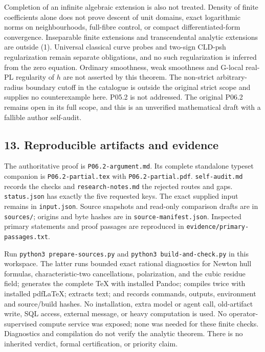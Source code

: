 \documentclass[11pt]{article}
\begin{document}
Completion of an infinite algebraic extension is also not treated.
Density of finite coefficients alone does not prove descent of unit
domains, exact logarithmic norms on neighbourhoods, full-fibre control,
or compact differentiated-form convergence. Inseparable finite
extensions and transcendental analytic extensions are outside (1).
Universal classical curve probes and two-sign CLD-psh regularization
remain separate obligations, and no such regularization is inferred from
the zero equation. Ordinary smoothness, weak smoothness and G-local
real-PL regularity of \(h\) are not asserted by this theorem. The
non-strict arbitrary-radius boundary cutoff in the catalogue is outside
the original strict scope and supplies no counterexample here. P05.2 is
not addressed. The original P06.2 remains open in its full scope, and
this is an unverified mathematical draft with a fallible author
self-audit.

\subsection{13. Reproducible artifacts and
evidence}\label{reproducible-artifacts-and-evidence}

The authoritative proof is \texttt{P06.2-argument.md}. Its complete
standalone typeset companion is \texttt{P06.2-partial.tex} with
\texttt{P06.2-partial.pdf}. \texttt{self-audit.md} records the checks
and \texttt{research-notes.md} the rejected routes and gaps.
\texttt{status.json} has exactly the five requested keys. The exact
supplied input remains in \texttt{input.json}. Source snapshots and
read-only comparison drafts are in \texttt{sources/}; origins and byte
hashes are in \texttt{source-manifest.json}. Inspected primary
statements and proof passages are reproduced in
\texttt{evidence/primary-passages.txt}.

Run \texttt{python3\ prepare-sources.py} and
\texttt{python3\ build-and-check.py} in this workspace. The latter runs
bounded exact rational diagnostics for Newton hull formulas,
characteristic-two cancellations, polarization, and the cubic residue
field; generates the complete TeX with installed Pandoc; compiles twice
with installed pdfLaTeX; extracts text; and records commands, outputs,
environment and source/build hashes. No installation, extra model or
agent call, old-artifact write, SQL access, external message, or heavy
computation is used. No operator-supervised compute service was exposed;
none was needed for these finite checks. Diagnostics and compilation do
not verify the analytic theorem. There is no inherited verdict, formal
certification, or priority claim.
\end{document}
